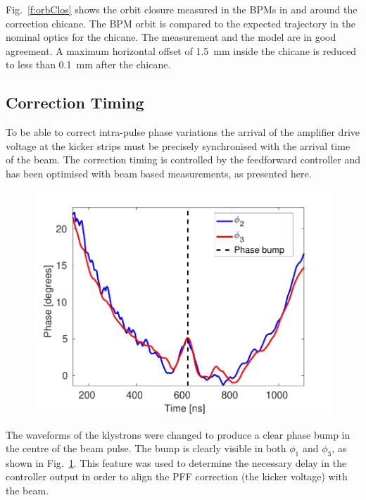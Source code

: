 \documentclass[%
 reprint,
 superscriptaddress,
 amsmath,
 amssymb,
 prstab,
]{revtex4-1}
\begin{document}
Fig.~\ref{f:orbClos} shows the orbit closure measured in the BPMs in and around 
the correction chicane. The BPM orbit is compared to the expected trajectory in 
the nominal optics for the chicane. The measurement and the model are in good 
agreement. A maximum horizontal offset of 1.5~mm inside the chicane is reduced 
to less than 0.1~mm after the chicane.

\subsection{\label{ss:timing}Correction Timing}

To be able to correct intra-pulse phase variations the arrival of the amplifier 
drive voltage at the kicker strips must be precisely synchronised with the 
arrival time of the beam. The correction timing is controlled by the 
feedforward controller and has been optimised with beam based measurements, as 
presented here.

\begin{figure}
	\includegraphics[width=\columnwidth]{figs/comis/bumpMon2Mon3}%
	\caption{\label{f:bumpMon2Mon3}
	}
\end{figure}

The waveforms of the klystrons were changed to produce a clear phase bump in 
the 
centre of the beam pulse. The bump is clearly visible in both \(\phi_1\) and 
\(\phi_3\), as shown in Fig.~\ref{f:bumpMon2Mon3}. This feature was used to 
determine the necessary delay in the controller output in order to align the 
PFF correction (the kicker voltage) with the beam. 
\end{document}
